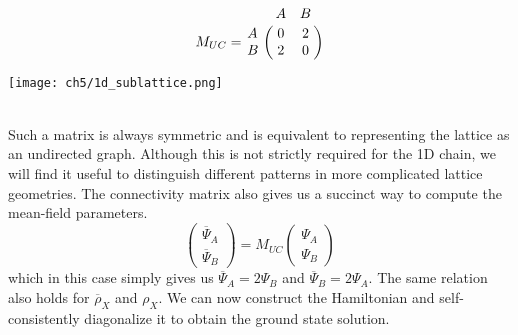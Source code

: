 \begin{minipage}{0.4\linewidth}
    \begin{equation*}
        M_{UC} =  \bordermatrix{ & A & B \cr
        A & 0 & 2 \cr
        B & 2 & 0 }
    \end{equation*}
\end{minipage}%
\begin{minipage}{0.5\linewidth}
\centering
\vspace{0.2cm}
\texttt{[image: ch5/1d\_sublattice.png]}
\end{minipage}
\vspace{0.5cm}\\
Such a matrix is always symmetric and is equivalent to representing the lattice as an undirected graph. Although this is not strictly required for the 1D chain, we will find it useful to distinguish different patterns in more complicated lattice geometries. The connectivity matrix also gives us a succinct way to compute the mean-field parameters.
\begin{equation}\label{eq:unit_cell}
    \begin{pmatrix}
        \overline{\Psi}_A \\
        \overline{\Psi}_B
    \end{pmatrix} = M_{UC}  \begin{pmatrix}
        \Psi_A \\
        \Psi_B
    \end{pmatrix}
\end{equation}
which in this case simply gives us $\overline{\Psi}_A = 2\Psi_B$ and $\overline{\Psi}_B = 2\Psi_A$. The same relation also holds for $\overline{\rho}_X$ and $\rho_X$. We can now construct the Hamiltonian and self-consistently diagonalize it to obtain the ground state solution.

